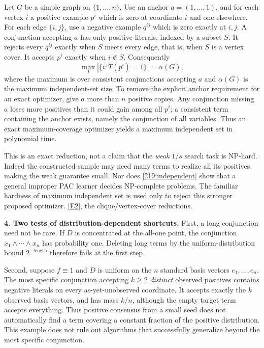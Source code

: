 \documentclass[11pt,a4paper]{article}
\newcommand{\eref}[2]{\hyperlink{extra:#1:#2}{[E#2]}}
\numberwithin{equation}{section}
\begin{document}
Let $G$ be a simple graph on $\{1,\ldots,n\}$. Use an anchor
$a=(1,\ldots,1)$, and for each vertex $i$ a positive example $p^i$ which
is zero at coordinate $i$ and one elsewhere. For each edge $\{i,j\}$,
use a negative example $q^{ij}$ which is zero exactly at $i,j$.
A conjunction accepting $a$ has only positive literals, indexed by a
subset $S$. It rejects every $q^{ij}$ exactly when $S$ meets every edge,
that is, when $S$ is a vertex cover. It accepts $p^i$ exactly when
$i\notin S$. Consequently
\begin{equation}\label{219:independent}
 \max_T|\{i:T(p^i)=1\}|=\alpha(G),
\end{equation}
where the maximum is over consistent conjunctions accepting $a$ and
$\alpha(G)$ is the maximum independent-set size.
To remove the explicit anchor requirement for an exact optimizer, give
$a$ more than $n$ positive copies. Any conjunction missing $a$ loses
more positives than it could gain among all $p^i$; a consistent term
containing the anchor exists, namely the conjunction of all variables.
Thus an exact maximum-coverage optimizer yields a maximum independent
set in polynomial time.

This is an exact reduction, not a claim that the \emph{weak} $1/s$
search task is NP-hard. Indeed the constructed sample may need many
terms to realize all its positives, making the weak guarantee small.
Nor does \eqref{219:independent} show that a general improper PAC
learner decides NP-complete problems. The familiar hardness of maximum
independent set is used only to reject this stronger proposed optimizer.
\eref{219}{2}, the clique/vertex-cover reductions.

\textbf{4. Two tests of distribution-dependent shortcuts.}
First, a long conjunction need not be rare. If $D$ is concentrated at
the all-one point, the conjunction $x_1\wedge\cdots\wedge x_n$ has
probability one. Deleting long terms by the uniform-distribution bound
$2^{-\text{length}}$ therefore fails at the first step.

Second, suppose $f\equiv1$ and $D$ is uniform on the $n$ standard basis
vectors $e_1,\ldots,e_n$. The most specific conjunction accepting
$k\ge2$ \emph{distinct} observed positives contains negative literals
on every as-yet-unobserved coordinate. It accepts exactly the $k$
observed basis vectors, and has mass $k/n$, although the empty target
term accepts everything. Thus positive consensus from a small seed does
not automatically find a term covering a constant fraction of the
positive distribution. This example does not rule out algorithms that
successfully generalize beyond the most specific conjunction.
\end{document}
